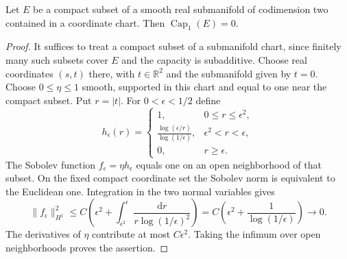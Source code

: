 \begin{lemma}\label{hessian:sobolev-codimension-two}
Let $E$ be a compact subset of a smooth real submanifold of
codimension two contained in a coordinate chart. Then
$\operatorname{Cap}_1(E)=0$.
\end{lemma}
\begin{proof}
It suffices to treat a compact subset of a submanifold chart, since
finitely many such subsets cover $E$ and the capacity is subadditive.
Choose real coordinates $(s,t)$ there, with $t\in\mathbb R^2$ and the
submanifold given by $t=0$. Choose $0\leq\eta\leq1$ smooth,
supported in this chart and equal to one near the compact subset.
Put $r=|t|$.
For $0<\epsilon<1/2$ define
\[
 h_\epsilon(r)=
 \begin{cases}
  1,&0\leq r\leq\epsilon^2,\\
  \displaystyle\frac{\log(\epsilon/r)}{\log(1/\epsilon)},
       &\epsilon^2<r<\epsilon,\\
  0,&r\geq\epsilon.
 \end{cases}
\]
The Sobolev function $f_\epsilon=\eta h_\epsilon$ equals one on an
open neighborhood of that subset. On the fixed compact coordinate
set the Sobolev norm is equivalent to the Euclidean one. Integration
in the two normal variables gives
\[
 \|f_\epsilon\|_{H^1}^2
 \leq C\left(\epsilon^2+
     \int_{\epsilon^2}^{\epsilon}
       \frac{\mathrm dr}{r\log(1/\epsilon)^2}\right)
 =C\left(\epsilon^2+\frac1{\log(1/\epsilon)}\right)
 \longrightarrow0.
\]
The derivatives of $\eta$ contribute at most $C\epsilon^2$.
Taking the infimum over open neighborhoods proves the assertion.
\end{proof}

